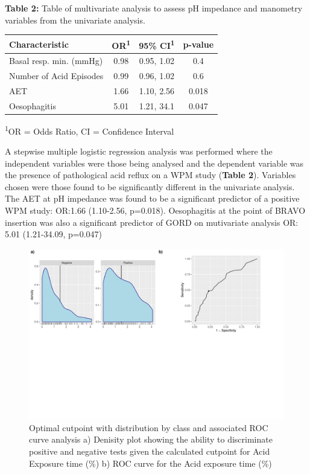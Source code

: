 \documentclass[english,man,floatsintext]{apa6}
\begin{document}
\textbf{Table 2:} Table of multivariate analysis to assess pH impedance and manometry variables from the univariate analysis.

\captionsetup[table]{labelformat=empty,skip=1pt}
\begin{longtable}{lccc}
\toprule
\textbf{Characteristic} & \textbf{OR}\textsuperscript{1} & \textbf{95\% CI}\textsuperscript{1} & \textbf{p-value} \\ 
\midrule
Basal resp. min. (mmHg) & 0.98 & 0.95, 1.02 & 0.4 \\ 
Number of Acid Episodes & 0.99 & 0.96, 1.02 & 0.6 \\ 
AET & 1.66 & 1.10, 2.56 & 0.018 \\ 
Oesophagitis & 5.01 & 1.21, 34.1 & 0.047 \\ 
\bottomrule
\end{longtable}
\vspace{-5mm}
\begin{minipage}{\linewidth}
\textsuperscript{1}OR = Odds Ratio, CI = Confidence Interval \\ 
\end{minipage}

A stepwise multiple logistic regression analysis was performed where the independent variables were those being analysed and the dependent variable was the presence of pathological acid reflux on a WPM study (\textbf{Table 2}). Variables chosen were those found to be significantly different in the univariate analysis. The AET at pH impedance was found to be a significant predictor of a positive WPM study: OR:1.66 (1.10-2.56, p=0.018). Oesophagitis at the point of BRAVO insertion was also a significant predictor of GORD on mutivariate analysis OR: 5.01 (1.21-34.09, p=0.047)

\newpage

\begin{figure}
\centering
\includegraphics{TemplateReport_files/figure-latex/CutPointForAcid-1.pdf}
\caption{\label{fig:CutPointForAcid}Optimal cutpoint with distribution by class and associated ROC curve analysis a) Denisity plot showing the ability to discriminate positive and negative tests given the calculated cutpoint for Acid Exposure time (\%) b) ROC curve for the Acid exposure time (\%)}
\end{figure}
\end{document}
